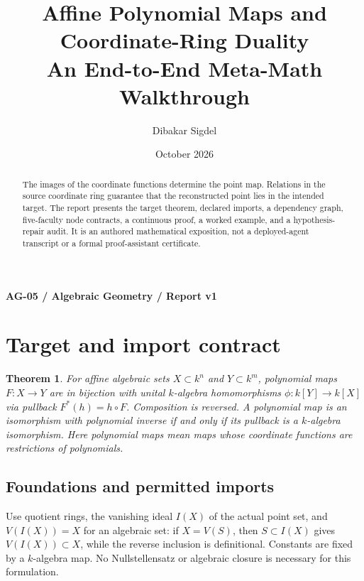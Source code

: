 \documentclass[preprint,12pt,aps,pra,showkeys,amsmath,amssymb,superscriptaddress,floatfix]{revtex4-2}
\newtheorem{theorem}{Theorem}[section]
\theoremstyle{definition}
\theoremstyle{remark}
\begin{document}
\title{Affine Polynomial Maps and Coordinate-Ring Duality\\[4pt]\large An End-to-End Meta-Math Walkthrough}

\author{Dibakar Sigdel}


\date{October 2026}

\begin{abstract}

The images of the coordinate functions determine the point map.
Relations in the source coordinate ring guarantee that the reconstructed
point lies in the intended target. The report presents the target
theorem, declared imports, a dependency graph, five-faculty node
contracts, a continuous proof, a worked example, and a hypothesis-repair
audit. It is an authored mathematical exposition, not a deployed-agent
transcript or a formal proof-assistant certificate.

\end{abstract}\maketitle\linespread{1.12}\selectfont

\noindent\textbf{AG-05 / Algebraic Geometry / Report v1}

\section{Target and import contract}

\begin{theorem}

For affine algebraic sets \(X\subset k^n\) and \(Y\subset k^m\),
polynomial maps \(F:X\to Y\) are in bijection with unital \(k\)-algebra
homomorphisms \(\phi:k[Y]\to k[X]\) via pullback \(F^*(h)=h\circ F\).
Composition is reversed. A polynomial map is an isomorphism with
polynomial inverse if and only if its pullback is a \(k\)-algebra
isomorphism. Here polynomial maps mean maps whose coordinate functions
are restrictions of polynomials.

\end{theorem}

\subsection{Foundations and permitted imports}

Use quotient rings, the vanishing ideal \(I(X)\) of the actual point
set, and \(V(I(X))=X\) for an algebraic set: if \(X=V(S)\), then
\(S\subset I(X)\) gives \(V(I(X))\subset X\), while the reverse
inclusion is definitional. Constants are fixed by a \(k\)-algebra map.
No Nullstellensatz or algebraic closure is necessary for this
formulation.
\end{document}
